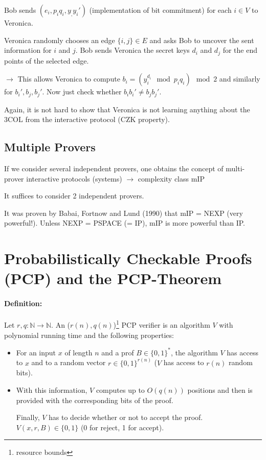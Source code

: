 \documentclass[11pt]{article}
\theoremstyle{definition}
\theoremstyle{definition}
\begin{document}
Bob sends $ (e_i, p_i q_i, y_, y_i') $ (implementation of bit commitment) for each $ i \in V $ to Veronica.

Veronica randomly chooses an edge $ \{i, j \} \in E $ and asks Bob to uncover the sent information for $ i $ and $ j $. Bob sends Veronica the secret keys $ d_i $ and $ d_j $ for the end points of the selected edge.

$ \rightarrow $ This allows Veronica to compute $ b_i = (y_i^{d_i} \mod p_i q_i) \mod 2 $ and similarly for $ b_i', b_j, b_j' $. Now just check whether $ b_i b_i' \neq b_j b_j' $.


Again, it is not hard to show that Veronica is not learning anything about the 3COL from the interactive protocol (CZK property).

\subsection{Multiple Provers}

If we consider several independent provers, one obtains the concept of multi-prover interactive protocols (systems) $ \rightarrow $ complexity class mIP

It suffices to consider 2 independent provers.

It was proven by Babai, Fortnow and Lund (1990) that mIP = NEXP (very powerful!). Unless NEXP = PSPACE (= IP), mIP is more powerful than IP. %


\section{Probabilistically Checkable Proofs (PCP) and the PCP-Theorem}


\paragraph{Definition:} Let $ r, q : \mathbb{N} \rightarrow \mathbb{N} $. An ($r (n), q(n)$)\footnote{resource bounds} PCP verifier is an algorithm $ V $ with polynomial running time and the following properties:
\begin{itemize}
\item For an input $ x $ of length $ n $ and a prof $ B \in \{0, 1 \}^\ast $, the algorithm $ V $ has access to $ x $ and to a random vector $ r \in \{0, 1 \}^{r(n)} $ ($ V $ has access to $ r(n) $ random bits).
\item With this information, $ V $ computes up to $ O(q(n)) $ positions and then is provided with the corresponding bits of the proof.

Finally, $ V $ has to decide whether or not to accept the proof. $ V(x, r, B) \in \{0, 1\} $ (0 for reject, 1 for accept).
\end{itemize} 
\end{document}
